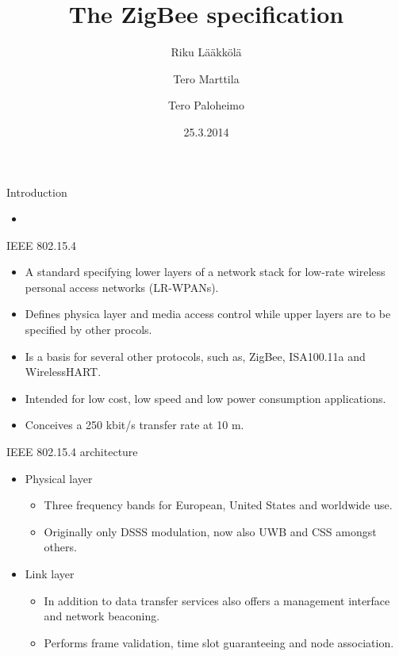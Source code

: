 \documentclass{beamer}
\title[ZigBee]{The ZigBee specification}
\author{Riku Lääkkölä \and Tero Marttila \and Tero Paloheimo}
\institute{Aalto ELEC}
\date{25.3.2014}
\begin{document}
\begin{frame}
  	\titlepage
\end{frame}


\begin{frame}{Introduction}
	\begin{itemize}
    \item 
 	\end{itemize}
\end{frame}

\begin{frame}{IEEE 802.15.4}
  \begin{itemize}
    \item A standard specifying lower layers of a network stack for low-rate
    wireless personal access networks (LR-WPANs).
    \item Defines physica layer and media access control while upper layers
    are to be specified by other procols.
    \item Is a basis for several other protocols, such as, ZigBee, ISA100.11a
    and WirelessHART.
    \item Intended for low cost, low speed and low power consumption applications.
    \item Conceives a 250 kbit/s transfer rate at 10 m.
  \end{itemize}
\end{frame}

\begin{frame}{IEEE 802.15.4 architecture}
  \begin{itemize}
    \item Physical layer
    \begin{itemize}
      \item Three frequency bands for European, United States and worldwide use.
      \item Originally only DSSS modulation, now also UWB and CSS amongst others.
    \end{itemize}
  \item Link layer
    \begin{itemize}
      \item In addition to data transfer services also offers a management
      interface and network beaconing.
      \item Performs frame validation, time slot guaranteeing and node association.
    \end{itemize}
  \end{itemize}
\end{frame}
\end{document}
